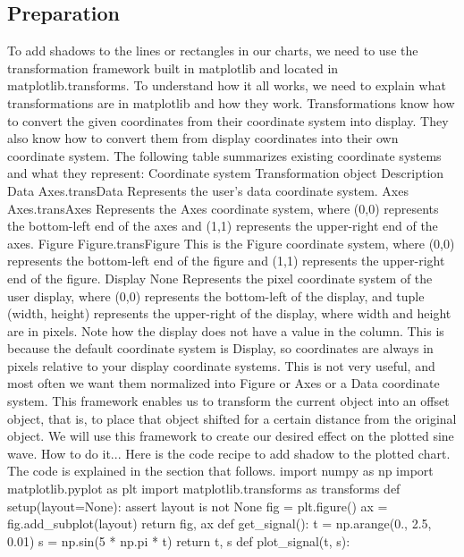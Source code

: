\subsection{Preparation}
To add shadows to the lines or rectangles in our charts, we need to use the transformation
framework built in matplotlib and located in matplotlib.transforms.
To understand how it all works, we need to explain what transformations are in matplotlib
and how they work.
Transformations know how to convert the given coordinates from their coordinate system
into display. They also know how to convert them from display coordinates into their own
coordinate system.
The following table summarizes existing coordinate systems and what they represent:
Coordinate
system
Transformation object Description
Data Axes.transData Represents the user's data coordinate system.
Axes Axes.transAxes Represents the Axes coordinate system, where
(0,0) represents the bottom-left end of the axes
and (1,1) represents the upper-right end of the
axes.
Figure Figure.transFigure This is the Figure coordinate system, where
(0,0) represents the bottom-left end of the figure
and (1,1) represents the upper-right end of the
figure.
Display None Represents the pixel coordinate system of the
user display, where (0,0) represents the
bottom-left of the display, and tuple (width,
height) represents the upper-right of the display,
where width and height are in pixels.
Note how the display does not have a value in the column. This is because the default
coordinate system is Display, so coordinates are always in pixels relative to your display
coordinate systems. This is not very useful, and most often we want them normalized into
Figure or Axes or a Data coordinate system.
This framework enables us to transform the current object into an offset object, that is,
to place that object shifted for a certain distance from the original object.
We will use this framework to create our desired effect on the plotted sine wave.
How to do it...
Here is the code recipe to add shadow to the plotted chart. The code is explained in the
section that follows.
import numpy as np
import matplotlib.pyplot as plt
import matplotlib.transforms as transforms
def setup(layout=None):
 assert layout is not None
 fig = plt.figure()
 ax = fig.add_subplot(layout)
 return fig, ax
def get_signal():
 t = np.arange(0., 2.5, 0.01)
 s = np.sin(5 * np.pi * t)
 return t, s
def plot_signal(t, s):

